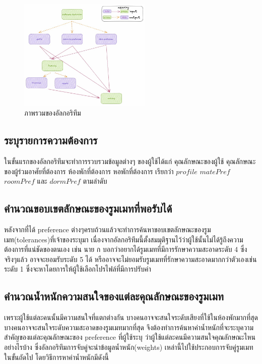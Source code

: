 \begin{figure}[ht]
  \begin{center}
    \includegraphics[width=2.5in]{photo/diagram/matching-flow.jpeg}
  \end{center}
  \caption{ภาพรวมของอัลกอริทึม}
  \label{fig:match-overall}
\end{figure}

\subsection{ระบุรายการความต้องการ}
ในขั้นแรกของอัลกอริทึมจะทำการรวบรวมข้อมูลต่างๆ ของผู้ใช้ได้แก่ 
คุณลักษณะของผู้ใช้ คุณลักษณะของผู้ร่วมอาศัยที่ต้องการ ห้องพักที่ต้องการ หอพักที่ต้องการ เรียกว่า $profile$ $matePref$ $roomPref$
และ $dormPref$ ตามลำดับ

\subsection{คำนวณขอบเขตลักษณะของรูมเมทที่พอรับได้}
หลังจากที่ได้ preference ต่างๆครบถ้วนแล้วจะทำการค้นหาขอบเขตลักษณะของรูมเมท(tolerances)ที่เจ้าของระบุมา
เนื่องจากอัลกอริทึมนี้ตั้งสมมุติฐานไว้ว่าผู้ใช้นั้นไม่ได้รู้ถึงความต้องการที่แน่ชัดของตนเอง เช่น 
นาย ก บอกว่าอยากได้รูมเมทที่มีการรักษาความสะอาดระดับ 4 ซึ่งจริงๆแล้ว อาจจะยอมรับระดับ 5 ได้ หรืออาจจะไม่ยอมรับรูมเมทที่รักษาความสะอาดมากกว่าตัวเองเช่นระดับ 1
ซึ่งจะหาโดยการให้ผู้ใช้เลือกโปรไฟล์ที่มีการปรับค่า 

\subsection{คำนวณน้ำหนักความสนใจของแต่ละคุณลักษณะของรูมเมท}
เพราะผู้ใช้แต่ละคนนั้นมีความสนใจที่แตกต่างกัน บางคนอาจจะสนใจระดับเสียงที่ใช้ในห้องพักมากที่สุด บางคนอาจจะสนใจระดับความสะอาดของรูมเมทมากที่สุด 
จึงต้องทำการค้นหาค่าน้ำหนักที่จะระบุความสำคัญของแต่ละคุณลักษณะของ preference ที่ผู้ใช้ระบุ ว่าผู้ใช้แต่ละคนมีความสนใจคุณลักษณะไหนอย่างไรบ้าง  
ซึ่งอัลกอริทึมการจับคู่จะนำข้อมูลน้ำหนัก(weights) เหล่านี้ไปใช้ประกอบการจับคู่รูมเมทในขั้นถัดไป โดยวิธีการหาค่าน้ำหนักมีดังนี้
